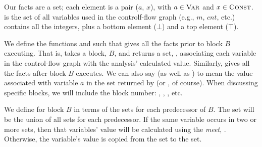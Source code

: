 \documentclass[12pt]{report}
\begin{document}
 Our facts are a set; each element is a pair ($a$, $x$),
with $a \in \textsc{Var}$ and $x \in \textsc{Const}$.  is the set of
all variables used in the controlf-flow graph (e.g., $m$, $cnt$, etc.)
\setLC contains all the integers, plus a bottom element ($\bot$) and a
top element ($\top$). 

We define the functions \inE and \out such that \inBa gives all the
facts prior to block $B$ executing. That is, \inBa takes a block, $B$,
and returns a set, , associating each variable in
the control-flow graph with the analysis' calculated value. Similarly,
\outBa gives all the facts after block $B$ executes. We can also say
 (as well as ) to mean the value associated with
variable $a$ in the set returned by \inBa (or \outBa, of course). When
discussing specific blocks, we will include the block number:
, ,
, etc.

 We define \inBa for block $B$ in terms of the \out
sets for each predecessor of $B$. The \inBa set will be the union of
all \out sets for each predecessor. If the same variable occurs in two
or more sets, then that variables' value will be calculated using the
\emph{meet}, \lub. Otherwise, the variable's value is copied from the
\out set to the \inBa set.
\end{document}
